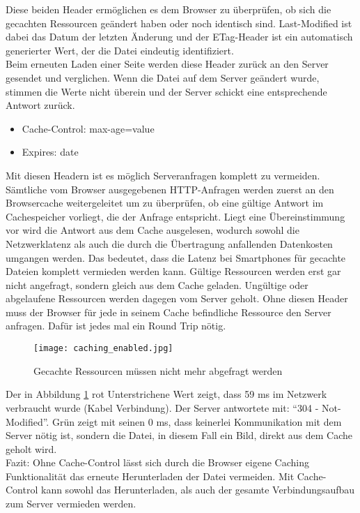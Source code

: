 			  Diese beiden Header ermöglichen es dem Browser zu überprüfen, ob sich die gecachten Ressourcen geändert haben oder noch identisch sind. Last-Modified ist dabei das Datum der letzten Änderung und der ETag-Header ist ein automatisch generierter Wert, der die Datei eindeutig identifiziert.\\
			  Beim erneuten Laden einer Seite werden diese Header zurück an den Server gesendet und verglichen. Wenn die Datei auf dem Server geändert wurde, stimmen die Werte nicht überein und der Server schickt eine entsprechende Antwort zurück.

			  \begin{itemize}
			  	\item Cache-Control: max-age=value
			  	\item Expires: date
			  \end{itemize}

			  Mit diesen Headern ist es möglich Serveranfragen komplett zu vermeiden. Sämtliche vom Browser ausgegebenen HTTP-Anfragen werden zuerst an den Browsercache weitergeleitet um zu überprüfen, ob eine gültige Antwort im Cachespeicher vorliegt, die der Anfrage entspricht. Liegt eine Übereinstimmung vor wird die Antwort aus dem Cache ausgelesen, wodurch sowohl die Netzwerklatenz als auch die durch die Übertragung anfallenden Datenkosten umgangen werden.\autocite[vgl.]{grigorikCaching} Das bedeutet, dass die Latenz bei Smartphones für gecachte Dateien komplett vermieden werden kann. Gültige Ressourcen werden erst gar nicht angefragt, sondern gleich aus dem Cache geladen. Ungültige oder abgelaufene Ressourcen werden dagegen vom Server geholt. Ohne diesen Header muss der Browser für jede in seinem Cache befindliche Ressource den Server anfragen. Dafür ist jedes mal ein Round Trip nötig.\\

			  \begin{figure}[htbp]
			  	\begin{center}
			  		\texttt{[image: caching\_enabled.jpg]}
			  		\caption{Gecachte Ressourcen müssen nicht mehr abgefragt werden}
			  		\label{fig:caching_enabled}
			  	\end{center}
			  \end{figure}
			  
			  Der in Abbildung \ref{fig:caching_enabled} rot Unterstrichene Wert zeigt, dass 59 ms im Netzwerk verbraucht wurde (Kabel Verbindung). Der Server antwortete mit: "`304 - Not-Modified"'. Grün zeigt mit seinen 0 ms, dass keinerlei Kommunikation mit dem Server nötig ist, sondern die Datei, in diesem Fall ein Bild, direkt aus dem Cache geholt wird.\\
			  Fazit: Ohne Cache-Control lässt sich durch die Browser eigene Caching Funktionalität das erneute Herunterladen der Datei vermeiden. Mit Cache-Control kann sowohl das Herunterladen, als auch der gesamte Verbindungsaufbau zum Server vermieden werden.\\
			 
